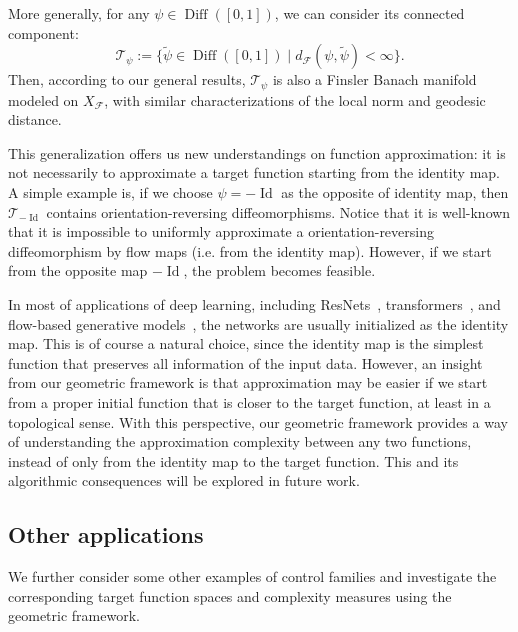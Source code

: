 \documentclass[12pt]{amsart}
\numberwithin{equation}{section}
\theoremstyle{remark}
\newcommand{\ql}[1]{\texttt{\color{cyan} QL: \footnotesize #1}}
\begin{document}
More generally, for any $\psi \in \operatorname{Diff}([0,1])$, we can consider its connected component:
\begin{equation}
    \mathcal T_\psi := \{\tilde \psi \in \operatorname{Diff}([0,1]) \mid d_{\mathcal F}(\psi, \tilde \psi) < \infty\}.
\end{equation}
Then, according to our general results, $\mathcal T_\psi$ is also a Finsler Banach manifold modeled on $X_{\mathcal F}$, with similar characterizations of the local norm and geodesic distance.

This generalization offers us new understandings on function approximation: it is not necessarily to approximate a target function starting from the identity map.
A simple example is, if we choose $\psi = -\operatorname{Id}$ as the opposite of identity map, then $\mathcal T_{-\operatorname{Id}}$ contains orientation-reversing diffeomorphisms. Notice that it is well-known that it is impossible to uniformly approximate a orientation-reversing diffeomorphism by flow maps (i.e. from the identity map). However, if we start from the opposite map $-\operatorname{Id}$, the problem becomes feasible.

In most of applications of deep learning, including ResNets~\cite{he2016deep}, transformers~\cite{vaswani2017attention}, and flow-based generative models~\cite{rezende2015variational,ho2020denoising,song2021score}, the networks are usually initialized as the identity map. This is of course a natural choice, since the identity map is the simplest function that preserves all information of the input data. However, an insight from our geometric framework is that approximation may be easier if we start from a proper initial function that is closer to the target function, at least in a topological sense.
With this perspective, our geometric framework provides a way of understanding the approximation complexity between any two functions, instead of only from the identity map to the target function.
This and its algorithmic consequences will be explored in future work.


\subsection{Other applications}
We further consider some other examples of control families and investigate the corresponding target function spaces and complexity measures using the geometric framework.
\end{document}
